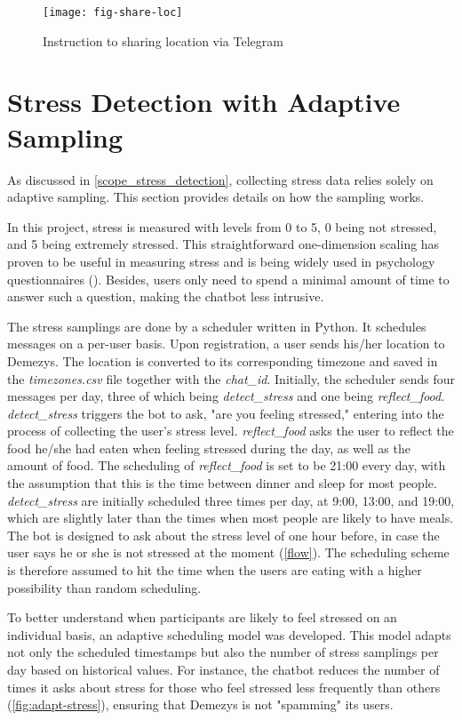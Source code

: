 \begin{figure}[ht]
  \centering
  \texttt{[image: fig-share-loc]}
  \caption{Instruction to sharing location via Telegram}
  \label{fig:share-loc}
\end{figure}

\section{Stress Detection with Adaptive Sampling}
As discussed in \autoref{scope_stress_detection}, collecting stress data relies solely on adaptive sampling. This section provides details on how the sampling works.

In this project, stress is measured with levels from 0 to 5, 0 being not stressed, and 5 being extremely stressed. This straightforward one-dimension scaling has proven to be useful in measuring stress and is being widely used in psychology questionnaires (\cite{41_stress_scale}). Besides, users only need to spend a minimal amount of time to answer such a question, making the chatbot less intrusive.

The stress samplings are done by a scheduler written in Python. It schedules messages on a per-user basis. Upon registration, a user sends his/her location to Demezys. The location is converted to its corresponding timezone and saved in the \emph{timezones.csv} file together with the \emph{chat\_id}. Initially, the scheduler sends four messages per day, three of which being \emph{detect\_stress} and one being \emph{reflect\_food}. \emph{detect\_stress} triggers the bot to ask, "are you feeling stressed," entering into the process of collecting the user's stress level. \emph{reflect\_food} asks the user to reflect the food he/she had eaten when feeling stressed during the day, as well as the amount of food. The scheduling of \emph{reflect\_food} is set to be 21:00 every day, with the assumption that this is the time between dinner and sleep for most people. \emph{detect\_stress} are initially scheduled three times per day, at 9:00, 13:00, and 19:00, which are slightly later than the times when most people are likely to have meals. The bot is designed to ask about the stress level of one hour before, in case the user says he or she is not stressed at the moment (\autoref{flow}). The scheduling scheme is therefore assumed to hit the time when the users are eating with a higher possibility than random scheduling.

To better understand when participants are likely to feel stressed on an individual basis, an adaptive scheduling model was developed. This model adapts not only the scheduled timestamps but also the number of stress samplings per day based on historical values. For instance, the chatbot reduces the number of times it asks about stress for those who feel stressed less frequently than others (\autoref{fig:adapt-stress}), ensuring that Demezys is not "spamming" its users.

